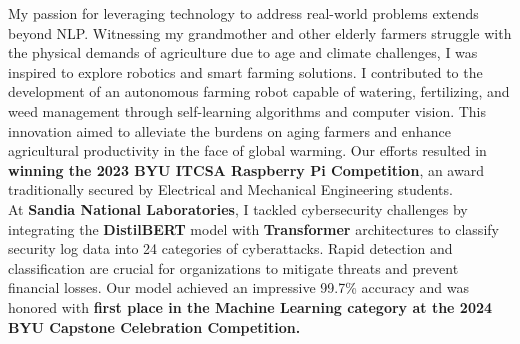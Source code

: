 \documentclass{article}
\begin{document}
My passion for leveraging technology to address real-world problems extends beyond NLP. Witnessing my grandmother and other elderly farmers struggle with the physical demands of agriculture due to age and climate challenges, I was inspired to explore robotics and smart farming solutions. I contributed to the development of an autonomous farming robot capable of watering, fertilizing, and weed management through self-learning algorithms and computer vision. This innovation aimed to alleviate the burdens on aging farmers and enhance agricultural productivity in the face of global warming. Our efforts resulted in \textbf{winning the 2023 BYU ITCSA Raspberry Pi Competition}, an award traditionally secured by Electrical and Mechanical Engineering students.
\\

At \textbf{Sandia National Laboratories}, I tackled cybersecurity challenges by integrating the \textbf{DistilBERT} model with \textbf{Transformer} architectures to classify security log data into 24 categories of cyberattacks. Rapid detection and classification are crucial for organizations to mitigate threats and prevent financial losses. Our model achieved an impressive 99.7\% accuracy and was honored with \textbf{first place in the Machine Learning category at the 2024 BYU Capstone Celebration Competition.}
\\
\end{document}
